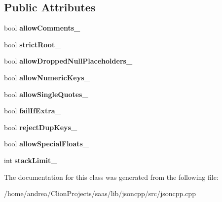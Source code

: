 \subsection*{Public Attributes}
\begin{DoxyCompactItemize}
\item 
bool {\bfseries allow\+Comments\+\_\+}\hypertarget{class_json_1_1_our_features_ac71bb7ba7363d3b05ed76602b036ce33}{}\label{class_json_1_1_our_features_ac71bb7ba7363d3b05ed76602b036ce33}

\item 
bool {\bfseries strict\+Root\+\_\+}\hypertarget{class_json_1_1_our_features_a2095f66a776c0a4ae6cc931a0c94242e}{}\label{class_json_1_1_our_features_a2095f66a776c0a4ae6cc931a0c94242e}

\item 
bool {\bfseries allow\+Dropped\+Null\+Placeholders\+\_\+}\hypertarget{class_json_1_1_our_features_a13963bc44bf948eec1968f7ff8e8f5f1}{}\label{class_json_1_1_our_features_a13963bc44bf948eec1968f7ff8e8f5f1}

\item 
bool {\bfseries allow\+Numeric\+Keys\+\_\+}\hypertarget{class_json_1_1_our_features_af6973fc7e774ce2d634ba99442aeb91a}{}\label{class_json_1_1_our_features_af6973fc7e774ce2d634ba99442aeb91a}

\item 
bool {\bfseries allow\+Single\+Quotes\+\_\+}\hypertarget{class_json_1_1_our_features_abbd6c196d7a22e2a360a59887eda4610}{}\label{class_json_1_1_our_features_abbd6c196d7a22e2a360a59887eda4610}

\item 
bool {\bfseries fail\+If\+Extra\+\_\+}\hypertarget{class_json_1_1_our_features_ae8ad25b90706c78f1a8fe929191ac61b}{}\label{class_json_1_1_our_features_ae8ad25b90706c78f1a8fe929191ac61b}

\item 
bool {\bfseries reject\+Dup\+Keys\+\_\+}\hypertarget{class_json_1_1_our_features_a39b8e0b86b1c24a45e800c023bb715aa}{}\label{class_json_1_1_our_features_a39b8e0b86b1c24a45e800c023bb715aa}

\item 
bool {\bfseries allow\+Special\+Floats\+\_\+}\hypertarget{class_json_1_1_our_features_af760f91cc2a7af37e44f78fb466061bb}{}\label{class_json_1_1_our_features_af760f91cc2a7af37e44f78fb466061bb}

\item 
int {\bfseries stack\+Limit\+\_\+}\hypertarget{class_json_1_1_our_features_a9a786713902d14be6d57a08cc03ccfff}{}\label{class_json_1_1_our_features_a9a786713902d14be6d57a08cc03ccfff}

\end{DoxyCompactItemize}


The documentation for this class was generated from the following file\+:\begin{DoxyCompactItemize}
\item 
/home/andrea/\+Clion\+Projects/saas/lib/jsoncpp/src/jsoncpp.\+cpp\end{DoxyCompactItemize}
